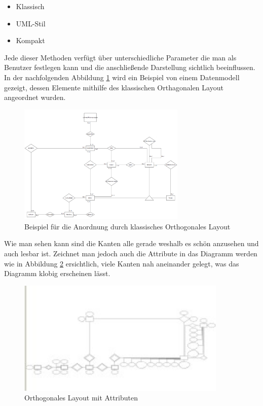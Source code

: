 \begin{itemize}
	\item Klassisch
	\item UML-Stil
	\item Kompakt
	\\
\end{itemize}

\noindent
Jede dieser Methoden verfügt über unterschiedliche Parameter die man als Benutzer festlegen kann und die anschließende Darstellung sichtlich beeinflussen. In der nachfolgenden Abbildung \ref{sisOrthogonalKlassisch} wird ein Beispiel von einem Datenmodell gezeigt, dessen Elemente mithilfe des klassischen Orthagonalen Layout angeordnet wurden.

\begin{figure}[H]
	\begin{center}
		\includegraphics[width=8cm]{images/sisOrthagonal.png}
		\caption{Beispiel für die Anordnung durch klassisches Orthogonales Layout}
		\label{sisOrthogonalKlassisch}
	\end{center}
\end{figure}

\noindent
Wie man sehen kann sind die Kanten alle gerade weshalb es schön anzusehen und auch lesbar ist. Zeichnet man jedoch auch die Attribute in das Diagramm werden wie in Abbildung \ref{orthogonalKlobig} ersichtlich, viele Kanten nah aneinander gelegt, was das Diagramm klobig erscheinen lässt.

\begin{figure}[H]
	\begin{center}
		\includegraphics[width=10cm]{images/orthogonalAttribute.png}
		\caption{Orthogonales Layout mit Attributen }
		\label{orthogonalKlobig}
	\end{center}
\end{figure}

